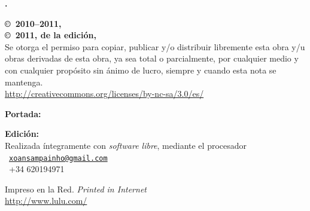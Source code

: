 \noindent
\textbf{\titlename. \subtitlename}\\
\authorname

\footnotesize

\bigskip\bigskip\noindent
\textbf{\copyright\ 2010--2011, \authorname}\\
\textbf{\copyright\ 2011, de la edición, \editorname}\\
Se otorga el permiso para copiar, publicar y/o distribuir libremente esta obra y/u obras derivadas de esta obra, ya sea total o parcialmente, por cualquier medio y con cualquier propósito sin ánimo de lucro, siempre y cuando esta nota se mantenga.\\
{\selectfont\url{http://creativecommons.org/licenses/by-nc-sa/3.0/es/}}

\bigskip\noindent
\textbf{Portada:} \coverauthorname

\bigskip\noindent
\textbf{Edición:} \editorname\\
Realizada íntegramente con \emph{software libre}, mediante el procesador \emph{\LaTeXe}\\
\Letter\ {\selectfont\href{mailto:xoansampainho@gmail.com}{\nolinkurl{xoansampainho@gmail.com}}}\\
\Telefon\ +34 620194971

\bigskip\noindent
Impreso en la Red. \emph{Printed in Internet}\\
{\selectfont\url{http://www.lulu.com/}}

\normalsize

\endinput
